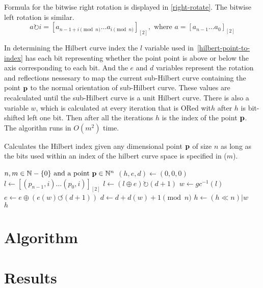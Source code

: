 \documentclass[10pt]{article}
\begin{document}
Formula for the bitwise right rotation is displayed in \ref{right-rotate}. The bitwise left rotation is similar.
\begin{equation}
  \label{right-rotate}
  a \rightturn i = \left[ a_{{n - 1 + i}\pmod{n}} \ldots a_{i\pmod{n}} \right]_{\left[ 2 \right]}, \text{ where } a = \left[ a_{n-1} \ldots a_0\right]_{\left[ 2 \right]} 
\end{equation}

In determining the Hilbert curve index the $l$ variable used in~\ref{hilbert-point-to-index} has each bit representing whether the point point is above or below the axis corresponding to each bit. And the $e$ and $d$ variables represent the rotation and reflections nessesary to map the current sub-Hilbert curve containing the point ${\bf p}$ to the normal orientation of sub-Hilbert curve. These values are recalculated until the sub-Hilbert curve is a unit Hilbert curve. There is also a variable $w$, which is calculated at every iteration that is ORed wit$h$ after $h$ is bit-shifted left one bit. Then after all the iterations $h$ is the index of the point ${\bf p}$. The algorithn runs in $O(m^2)$ time.

\begin{algorithm}
  \caption{Calculates the Hilbert index given any dimensional point ${\bf p}$ 
    of size $n$ as long as the bits used within an index of the hilbert curve 
    space is specified in ($m$).}
  \label{hilbert-point-to-index}
  \begin{algorithmic}[1]
    \Require $n, m \in \mathbb{N} - \{0\} \text{ and a point } {\bf p} \in \mathbb{N}^n$ 
    \State $ \left( h, e, d \right) \leftarrow \left( 0, 0, 0 \right) $
    \State $ l \leftarrow \left[ \left( p_{n-1} , i \right) \ldots \left( p_0 , i \right) \right]_{\left[ 2 \right]} $ 
    \State $ l \leftarrow \left( l \oplus e \right) \rightturn \left( d+1 \right)$ 
    \State $ w \leftarrow gc^{-1} \left( l \right)$ 
    \State $ e \leftarrow e \oplus \left( e \left( w \right) \leftturn \left( d+ 1 \right) \right) $ 
    \State $ d \leftarrow d + d \left( w \right) + 1 \pmod{n}$ 
    \State $ h \leftarrow \left( h \ll n \right) | w $
    \EndFor \\
    \Return $h $%

  \end{algorithmic}
\end{algorithm}

\section{Algorithm}

\section{Results}



\end{document}
